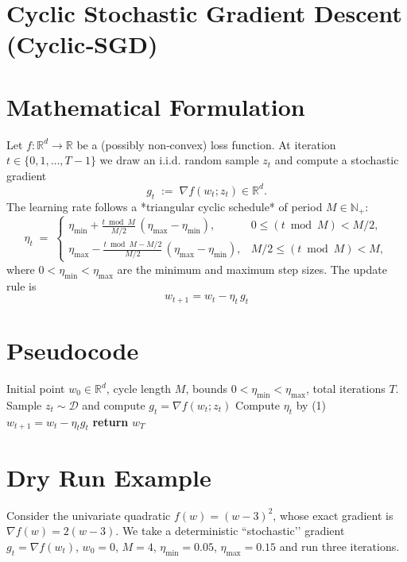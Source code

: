 \documentclass{article}
\begin{document}
\section*{Cyclic Stochastic Gradient Descent (Cyclic‑SGD)}

\section*{Mathematical Formulation}
Let $f:\mathbb{R}^{d}\rightarrow\mathbb{R}$ be a (possibly non‑convex) loss function.  
At iteration $t\in\{0,1,\dots,T-1\}$ we draw an i.i.d. random sample $z_t$ and compute a stochastic gradient
\[
g_t \;:=\;\nabla f(w_t;z_t)\in\mathbb{R}^{d}.
\]
The learning rate follows a *triangular cyclic schedule* of period $M\in\mathbb{N}_{+}$:
\[
\eta_t \;=\;
\begin{cases}
\displaystyle \eta_{\min}+ \frac{t\bmod M}{M/2}\,(\eta_{\max}-\eta_{\min}), & 0\le (t\bmod M)< M/2,\\[2ex]
\displaystyle \eta_{\max}- \frac{t\bmod M-M/2}{M/2}\,(\eta_{\max}-\eta_{\min}), & M/2\le (t\bmod M)< M,
\end{cases}
\tag{1}
\]
where $0<\eta_{\min}<\eta_{\max}$ are the minimum and maximum step sizes.  
The update rule is
\[
\boxed{\,w_{t+1}= w_t-\eta_t\, g_t\, } \tag{2}
\]

\section*{Pseudocode}
\begin{algorithm}[H]
\caption{Cyclic‑SGD}
\begin{algorithmic}[1]
\Require Initial point $w_{0}\in\mathbb{R}^{d}$, cycle length $M$, bounds $0<\eta_{\min}<\eta_{\max}$, total iterations $T$.
    \State Sample $z_t\sim\mathcal{D}$ and compute $g_t=\nabla f(w_t;z_t)$
    \State Compute $\eta_t$ by (1)   
    \State $w_{t+1}= w_t-\eta_t g_t$   
\EndFor
\State \textbf{return} $w_T$
\end{algorithmic}
\end{algorithm}

\section*{Dry Run Example}
Consider the univariate quadratic $f(w)=(w-3)^2$, whose exact gradient is $\nabla f(w)=2(w-3)$.  
We take a deterministic ``stochastic’’ gradient $g_t=\nabla f(w_t)$, $w_0=0$, $M=4$, $\eta_{\min}=0.05$, $\eta_{\max}=0.15$ and run three iterations.
\end{document}
